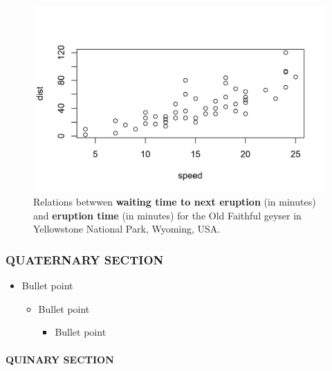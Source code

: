 \documentclass[
  12pt,
  a4paper,
  oneside]{tesesusp}
\let\oldparagraph\paragraph
\renewcommand{\paragraph}[1]{\oldparagraph{#1}\mbox{}}
\providecommand{\tightlist}{%
  \setlength{\itemsep}{0pt}\setlength{\parskip}{0pt}}\usepackage{longtable,booktabs,array}
\begin{document}
\begin{figure}[H]

\caption{Relations betwwen \textbf{waiting time to next eruption} (in
minutes) and \textbf{eruption time} (in minutes) for the Old Faithful
geyser in Yellowstone National Park, Wyoming, USA.}

{\centering \includegraphics{index_files/figure-pdf/unnamed-chunk-4-1.png}

}

\end{figure}

\hypertarget{quaternary-section}{%
\subsubsection{QUATERNARY SECTION}\label{quaternary-section}}

\begin{itemize}
\tightlist
\item
  Bullet point

  \begin{itemize}
  \tightlist
  \item
    Bullet point

    \begin{itemize}
    \tightlist
    \item
      Bullet point
    \end{itemize}
  \end{itemize}
\end{itemize}

\hypertarget{quinary-section}{%
\paragraph{QUINARY SECTION}\label{quinary-section}}
\end{document}
